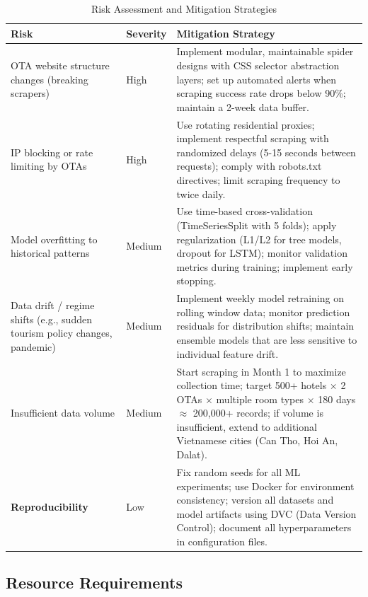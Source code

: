 \documentclass[12pt,a4paper]{report}
\begin{document}
\begin{table}[H]
\centering
\caption{Risk Assessment and Mitigation Strategies}
\label{tab:risks}
\begin{tabular}{|p{3cm}|p{2cm}|p{8cm}|}
\hline
\textbf{Risk} & \textbf{Severity} & \textbf{Mitigation Strategy} \\
\hline
OTA website structure changes (breaking scrapers) & High & Implement modular, maintainable spider designs with CSS selector abstraction layers; set up automated alerts when scraping success rate drops below 90\%; maintain a 2-week data buffer. \\
\hline
IP blocking or rate limiting by OTAs & High & Use rotating residential proxies; implement respectful scraping with randomized delays (5-15 seconds between requests); comply with robots.txt directives; limit scraping frequency to twice daily. \\
\hline
Model overfitting to historical patterns & Medium & Use time-based cross-validation (TimeSeriesSplit with 5 folds); apply regularization (L1/L2 for tree models, dropout for LSTM); monitor validation metrics during training; implement early stopping. \\
\hline
Data drift / regime shifts (e.g., sudden tourism policy changes, pandemic) & Medium & Implement weekly model retraining on rolling window data; monitor prediction residuals for distribution shifts; maintain ensemble models that are less sensitive to individual feature drift. \\
\hline
Insufficient data volume & Medium & Start scraping in Month 1 to maximize collection time; target 500+ hotels $\times$ 2 OTAs $\times$ multiple room types $\times$ 180 days $\approx$ 200,000+ records; if volume is insufficient, extend to additional Vietnamese cities (Can Tho, Hoi An, Dalat). \\
\hline
\textbf{Reproducibility} & Low & Fix random seeds for all ML experiments; use Docker for environment consistency; version all datasets and model artifacts using DVC (Data Version Control); document all hyperparameters in configuration files. \\
\hline
\end{tabular}
\end{table}

\subsection{Resource Requirements}
\end{document}
